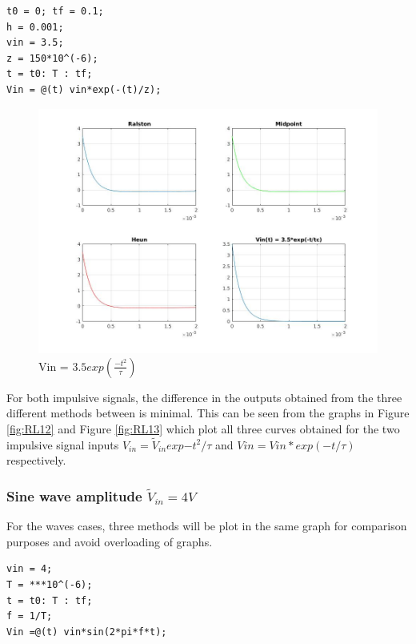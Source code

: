 \documentclass[11pt,a4paper]{article}
\begin{document}
\begin{verbatim}
t0 = 0; tf = 0.1;
h = 0.001;
vin = 3.5;
z = 150*10^(-6);
t = t0: T : tf;
Vin = @(t) vin*exp(-(t)/z);
\end{verbatim}

\begin{figure}[h]
	\includegraphics[width=\textwidth]{Ex1_Figs/subt.jpg}
	\vspace{-6mm}
	\caption{Vin = $3.5exp(\frac{-t^2}{\tau})$}
	\label{fig:RL4}
\end{figure}


For both impulsive signals, the difference in the outputs obtained from the three different methods between  is minimal. This can be seen from the graphs in Figure \ref{fig:RL12} and Figure \ref{fig:RL13} which plot all three curves obtained for the two impulsive signal inputs $V_{in} = \tilde{V}_{in}  exp{-t^2/\tau}$ and $Vin = Vin*exp(-t/\tau)$ respectively.

\newpage
\subsubsection{Sine wave amplitude $\tilde{V}_{in} = 4V$}

For the waves cases, three methods will be plot in the same graph for comparison purposes and avoid overloading of graphs.

\begin{verbatim}
vin = 4;
T = ***10^(-6);
t = t0: T : tf;
f = 1/T;
Vin =@(t) vin*sin(2*pi*f*t);
\end{verbatim}
\end{document}
